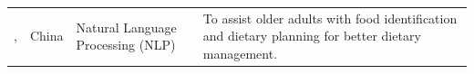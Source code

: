 \begin{longtable}{p{}p{}p{}p{}}
    \addlinespace
    \citeauthor{wangAreNutritionalLabeling2024}, \citeyear{wangAreNutritionalLabeling2024}                                             & China             & Natural Language Processing (NLP) & To assist older adults with food identification and dietary planning for better dietary management.                                                                                                                                    \\
\end{longtable}
